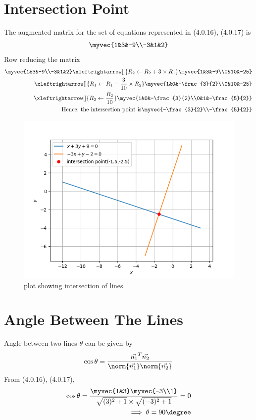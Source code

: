 \section{Intersection Point}
The augmented matrix for the set of equations represented in (4.0.16), (4.0.17) is
\begin{align}
\myvec{1&3&-9\\-3&1&2}
\end{align}
Row reducing the matrix
\begin{align}
 \myvec{1&3&-9\\-3&1&2}\xleftrightarrow[]{R_2\leftarrow R_2+3\times R_1}\myvec{1&3&-9\\0&10&-25}\\
 \xleftrightarrow[]{R_1\leftarrow R_1-\frac{3}{10}\times R_2}\myvec{1&0&-\frac{3}{2}\\0&10&-25}\\
 \xleftrightarrow[]{R_2\leftarrow \frac{R_2}{10}}\myvec{1&0&-\frac{3}{2}\\0&1&-\frac{5}{2}}\\
\text{Hence, the intersection point is}
\myvec{-\frac{3}{2}\\-\frac{5}{2}}
\end{align}
\begin{figure}[!ht]
\centering
\includegraphics[width=\columnwidth]{hw4plot.png}
\caption{plot showing intersection of lines}
\label{Fig}
\end{figure}
\newpage
\section{Angle Between The Lines}
Angle between two lines $\theta$ can be given by
\begin{align}
\cos \theta = \frac{\vec{n_1}^T\vec{n_2}}{\norm{\vec{n_1}}\norm{\vec{n_2}}}
\end{align}
From (4.0.16), (4.0.17),
\begin{align}
\cos \theta=\frac{\myvec{1&3}\myvec{-3\\1}}{\sqrt{(3)^2 +1} \times \sqrt{(-3)^2 +1}}=0\\
\implies \theta = 90\degree
\end{align}


